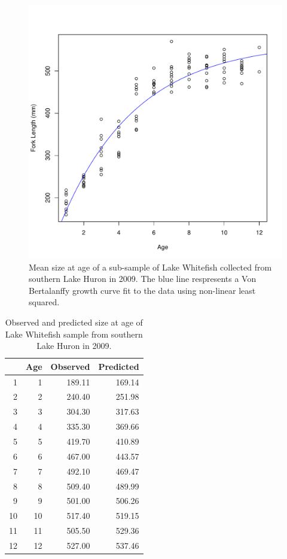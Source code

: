 \documentclass{article}\usepackage[]{graphicx}\usepackage[]{color}
\begin{document}
\begin{figure}
  \begin{center} 
     \includegraphics[width=\textwidth]{plot_fit} 
  \end{center} 
  \caption{Mean size at age of a sub-sample of Lake Whitefish
    collected from southern Lake Huron in 2009.  The blue line
    respresents a Von Bertalanffy growth curve fit to the data using
    non-linear least squared.}
  \label{fig:plot_fit}
\end{figure}


\begin{table}[ht]
\centering
\begin{tabular}{rrrr}
  \hline
 & Age & Observed & Predicted \\ 
  \hline
1 &   1 & 189.11 & 169.14 \\ 
  2 &   2 & 240.40 & 251.98 \\ 
  3 &   3 & 304.30 & 317.63 \\ 
  4 &   4 & 335.30 & 369.66 \\ 
  5 &   5 & 419.70 & 410.89 \\ 
  6 &   6 & 467.00 & 443.57 \\ 
  7 &   7 & 492.10 & 469.47 \\ 
  8 &   8 & 509.40 & 489.99 \\ 
  9 &   9 & 501.00 & 506.26 \\ 
  10 &  10 & 517.40 & 519.15 \\ 
  11 &  11 & 505.50 & 529.36 \\ 
  12 &  12 & 527.00 & 537.46 \\ 
   \hline
\end{tabular}
\caption{Observed and predicted size at age of Lake Whitefish sample from southern Lake Huron in 2009.} 
\label{tbl:size-at-age}
\end{table}
\end{document}
